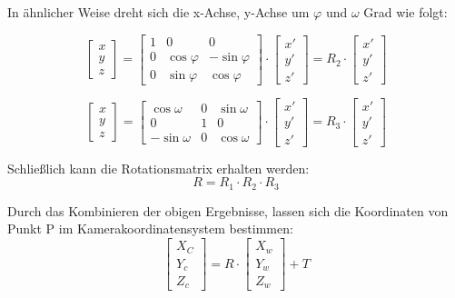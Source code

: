 In ähnlicher Weise dreht sich die x-Achse, y-Achse um $\varphi$ und $\omega$ Grad wie folgt:

\begin{equation}
   \begin{bmatrix}
	x \\  
	y \\
	z
	\end{bmatrix} = \begin{bmatrix}
		1   & 0          & 0	\\
		0   & \cos\varphi & -\sin\varphi	\\
	    0   & \sin\varphi& \cos\varphi	
	\end{bmatrix} \cdot \begin{bmatrix}
	x' \\  
	y' \\
	z'
	\end{bmatrix}= R_2 \cdot \begin{bmatrix}
	x' \\  
	y' \\
	z'
	\end{bmatrix}
\end{equation}

\begin{equation}
   \begin{bmatrix}
	x \\  
	y \\
	z
	\end{bmatrix} = \begin{bmatrix}
	\cos\omega  & 0           & \sin\omega	\\		
	0    	    & 1           & 0	\\
	-\sin\omega &0            &  \cos\omega
	\end{bmatrix} \cdot \begin{bmatrix}
	x' \\  
	y' \\
	z'
	\end{bmatrix}= R_3 \cdot \begin{bmatrix}
	x' \\  
	y' \\
	z'
	\end{bmatrix}
\end{equation}

Schließlich kann die Rotationsmatrix erhalten werden:
\begin{equation}
   R = R_1 \cdot R_2 \cdot R_3
\end{equation}

Durch das Kombinieren der obigen Ergebnisse, lassen sich die Koordinaten von Punkt P im Kamerakoordinatensystem bestimmen:
\begin{equation}
   \begin{bmatrix}
	X_C \\  
	Y_c \\
	Z_c
	\end{bmatrix} = R \cdot \begin{bmatrix}
	X_w \\  
	Y_w \\
	Z_w 
	\end{bmatrix} +T
\end{equation}

